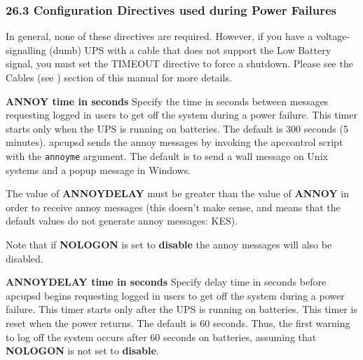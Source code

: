 {{{{{{{{{{{\begin{description}
{{This filename may also be specified at build time by using the {\tt
\verb{--{with-log-dir=} option of the {\tt ./configure} program. 
\end{description}

\label{Configuration-Directives-used-during-Power-Failures}

\subsubsection*{26.3 Configuration Directives used during Power Failures}

\label{index-Directives_002c-Power-fail-243}
\label{index-Power-fail-directives-244}
In general, none of these directives are required. However, if you have a
voltage-signalling (dumb) UPS with a cable that does not support the Low
Battery signal, you must set the TIMEOUT directive to force a shutdown. Please
see the Cables (see 
) section of this manual for more details.  

\begin{description}

\item {\bf ANNOY \lt{}time in seconds\gt{}}
Specify the time in seconds between messages requesting logged in users to get
off the system during a power failure. This timer starts only when the UPS is
running on batteries. The default is 300 seconds (5 minutes). apcupsd sends
the annoy messages by invoking the apccontrol script with the {\tt annoyme}
argument. The default is to send a wall message on Unix systems and a popup
message in Windows.  

The value of {\bf ANNOYDELAY} must be greater than the value of {\bf ANNOY} in
order to receive annoy messages (this doesn't make sense, and means that the
default values do not generate annoy messages: KES).  

Note that if {\bf NOLOGON} is set to {\bf disable} the annoy messages will
also be disabled.  

\item {\bf ANNOYDELAY \lt{}time in seconds\gt{}}
Specify delay time in seconds before apcupsd begins requesting logged in users
to get off the system during a power failure. This timer starts only after the
UPS is running on batteries. This timer is reset when the power returns. The
default is 60 seconds. Thus, the first warning to log off the system occurs
after 60 seconds on batteries, assuming that {\bf NOLOGON} is not set to {\bf
disable}.  


\end{description}}}}}}}}}}}}
